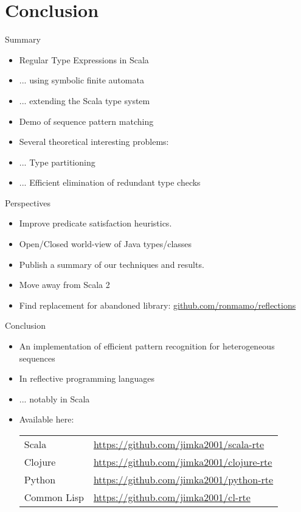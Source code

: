 \section{Conclusion}

{  %
\begin{frame}{Summary}
  \begin{itemize}
  \item Regular Type Expressions in Scala
  \item ... using symbolic finite automata
  \item ... extending the Scala type system
  \item Demo of sequence pattern matching
  \item Several theoretical interesting problems:
  \item ... Type partitioning
  \item ... Efficient elimination of redundant type checks
  \end{itemize}
\end{frame}
}

\begin{frame}{Perspectives}
  \begin{itemize}
  \item Improve predicate satisfaction heuristics.
  \item Open/Closed world-view of Java types/classes
  \item Publish a summary of our techniques and results.
  \item Move away from Scala 2
  \item Find replacement for abandoned library:   \url{github.com/ronmamo/reflections}
  \end{itemize}
\end{frame}

\begin{frame}{Conclusion}
  \begin{itemize}
  \item An implementation of efficient pattern recognition for heterogeneous sequences
  \item In reflective programming languages
  \item ... notably in Scala
  \item Available here:

    \medskip
    
    \begin{tabular}{ll}
    Scala & \url{https://github.com/jimka2001/scala-rte}\\
    Clojure & \url{https://github.com/jimka2001/clojure-rte}\\
    Python & \url{https://github.com/jimka2001/python-rte}\\
    Common Lisp & \url{https://github.com/jimka2001/cl-rte}    
  \end{tabular}
  \end{itemize}
\end{frame}

